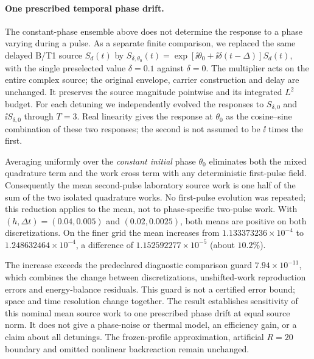 \paragraph{One prescribed temporal phase drift.}
The constant-phase ensemble above does not determine the response to a
phase varying during a pulse. As a separate finite comparison, we replaced
the same delayed B/T1 source $S_d(t)$ by
$S_{\delta,\theta_0}(t)=\exp[\ii\theta_0+\ii\delta(t-\Delta)]S_d(t)$,
with the single preselected value $\delta=0.1$ against $\delta=0$.
The multiplier acts on the entire complex source; the original envelope,
carrier construction and delay are unchanged. It preserves the source
magnitude pointwise and its integrated $L^2$ budget. For each detuning we
independently evolved the responses to $S_{\delta,0}$ and
$\ii S_{\delta,0}$ through $T=3$. Real linearity gives the response at
$\theta_0$ as the cosine--sine combination of these two responses;
the second is not assumed to be $\ii$ times the first.

Averaging uniformly over the \emph{constant initial} phase $\theta_0$
eliminates both the mixed quadrature term and the work cross term with
any deterministic first-pulse field. Consequently the mean second-pulse
laboratory source work is one half of the sum of the two isolated
quadrature works. No first-pulse evolution was repeated; this reduction
applies to the mean, not to phase-specific two-pulse work. With
$(h,\Delta t)=(0.04,0.005)$ and $(0.02,0.0025)$, both means are positive
on both discretizations. On the finer grid the mean increases from
$1.133373236\times10^{-4}$ to $1.248632464\times10^{-4}$,
a difference of $1.152592277\times10^{-5}$ (about $10.2\%$).

The increase exceeds the predeclared diagnostic comparison guard
$7.94\times10^{-11}$, which combines the change between discretizations,
unshifted-work reproduction errors and energy-balance residuals.
This guard is not a certified error bound; space and time resolution change
together. The result establishes sensitivity of this nominal mean source
work to one prescribed phase drift at equal source norm. It does not give
a phase-noise or thermal model, an efficiency gain, or a claim about all
detunings. The frozen-profile approximation, artificial $R=20$ boundary
and omitted nonlinear backreaction remain unchanged.
